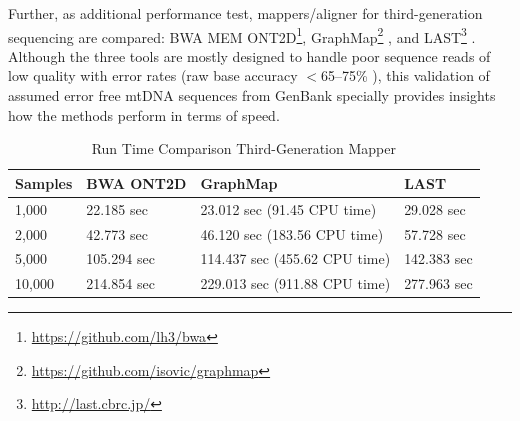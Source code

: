 Further, as additional performance test, mappers/aligner for third-generation sequencing are compared: BWA MEM ONT2D\footnote{\url{https://github.com/lh3/bwa}}, GraphMap\footnote{\url{https://github.com/isovic/graphmap}} \cite{Sovi2016}, and LAST\footnote{\url{http://last.cbrc.jp/}} \cite{Kielbasa2011}. Although the three tools are mostly designed to handle poor sequence reads of low quality with error rates (raw base accuracy $<$65–75\% \cite{Sovi2016}), this validation of assumed error free mtDNA sequences from GenBank \cite{Yao2009} specially provides insights how the methods perform in terms of speed.
\begin{table}[H]
\centering
\caption{Run Time Comparison Third-Generation Mapper}
\label{align:comp3Gen}
\begin{tabular}{|l|l|l|l|}
\hline
Samples & BWA ONT2D & GraphMap & LAST \\ \hline
1,000 &    22.185 sec  &  23.012 sec (91.45 CPU time)  &    29.028 sec    \\ \hline
2,000 &    42.773 sec &  46.120 sec (183.56 CPU time)   &   57.728 sec   \\ \hline
5,000  &   105.294 sec &   114.437 sec (455.62 CPU time) &  142.383 sec   \\ \hline
10,000 &   214.854 sec &  229.013 sec (911.88 CPU time) &  277.963  sec    \\ \hline
\end{tabular}
\end{table}




